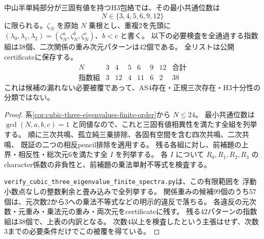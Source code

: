 \begin{theorem}
\label{thm:cubic-three-eigenvalue-38-list}
中山半単純部分が三固有値を持つH3包絡では、その最小共通位数は
\[
 N\in\{3,4,5,6,9,12\}
\]
に限られる。$\zeta_N$ を原始 $N$ 乗根とし、重複2を先頭に
$(\lambda_0,\lambda_1,\lambda_2)=(\zeta_N^a,\zeta_N^b,\zeta_N^c)$、$b<c$ と書く。
以下の必要検査を全通過する指数組は38個、二次関係の重み次元パターンは42個である。
全リストは公開certificateに保存する。
\[
\begin{array}{c|rrrrrr|r}
N&3&4&5&6&9&12&\text{合計}\\\hline
\text{指数組}&3&12&4&11&6&2&38
\end{array}
\]
これは候補の漏れない必要被覆であって、AS4存在・正規三次存在・H3十分性の分類ではない。
\end{theorem}
\begin{proof}
系\ref{cor:cubic-three-eigenvalues-finite-order}から $N\le24$。
最小共通位数は $\gcd(N,a,b,c)=1$ と同値なので、これと三固有値相異性を満たす全組を列挙する。
順に三次共鳴、孤立純三乗排除、各固有空間を含む四次共鳴、二次共鳴、
既証の二つの相反pencil排除を適用する。
残る各組に対し、前補題の上界・相反性・総次元6を満たす全 $I$ を列挙する。
各 $I$ について $R_0,R_1,R_2,R_3$ のcharacter係数の非負性と、前補題の乗法単射不等式を検査する。

\texttt{verify\_cubic\_three\_eigenvalue\_finite\_spectra.py}は、この有限範囲を
浮動小数点なしの整数剰余と畳み込みで全列挙する。
関係重みの候補99個のうち57個は、元次数2から3への乗法不等式などの明示的違反で落ちる。
各違反の元次数・元重み・乗法元の重み・両次元をcertificateに残す。
残る42パターンの指数組は38個で、上表の内訳となる。
次数4以上を検査したという主張はせず、次数3までの必要条件だけでこの被覆を得ている。
\end{proof}

